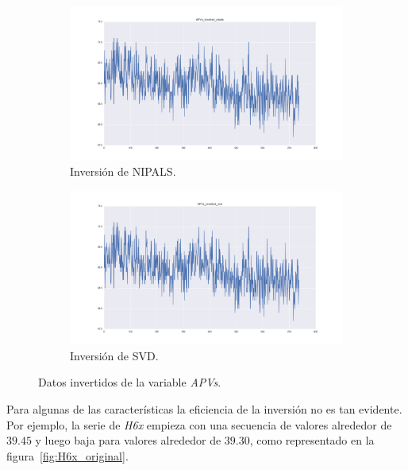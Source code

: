 \documentclass[11pt,spanish,listoffigures,listoftables]{tfgetsinf}
\begin{document}
    \begin{figure}[H]
        \centering
        \begin{subfigure}[h]{0.49\textwidth}
            \centering
            \includegraphics[width=\textwidth]{APVs_inverted_nipals.png}
            \caption{Inversión de NIPALS.}
            \label{fig:APVs_inverted_nipals}
        \end{subfigure}
        \begin{subfigure}[h]{0.49\textwidth}
            \centering
            \includegraphics[width=\textwidth]{APVs_inverted_svd.png}
            \caption{Inversión de SVD.}
            \label{fig:APVs_inverted_svd}
        \end{subfigure}
        \caption{Datos invertidos de la variable {\em APVs}.}
        \label{fig:APVs_inverted}
    \end{figure}    
    
    Para algunas de las características la eficiencia de la inversión no es tan evidente. Por ejemplo, la serie de {\em H6x} empieza con una secuencia de valores alrededor de \(39.45\) y luego baja para valores alrededor de \(39.30\), como representado en la figura~\ref{fig:H6x_original}. 
    
\end{document}
